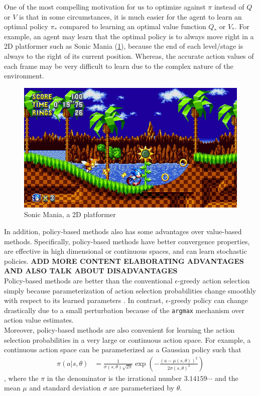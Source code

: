 \documentclass[12pt]{report}
\begin{document}
One of the most compelling motivation for us to optimize against $\pi$ instead of $Q$ or $V$ is that in some circumstances, it is much easier for the agent to learn an optimal policy $\pi_*$ compared to learning an optimal value function $Q_*$ or $V_*$. For example, an agent may learn that the optimal policy is to always move right in a 2D platformer such as Sonic Mania (\ref{fig:sonic}), because the end of each level/stage is always to the right of its current position. Whereas, the accurate action values of each frame may be very difficult to learn due to the complex nature of the environment.
\begin{figure}[H]
    \center
    \includegraphics[width=0.3\linewidth]{figs/sonic_mania.jpg}
    \caption{Sonic Mania, a 2D platformer}
    \label{fig:sonic}
\end{figure}
In addition, policy-based methods also has some advantages over value-based methods. Specifically, policy-based methods have better convergence properties, are effective in high dimensional or continuous spaces, and can learn stochastic policies. \textbf{ADD MORE CONTENT ELABORATING ADVANTAGES AND ALSO TALK ABOUT DISADVANTAGES}\\

Policy-based methods are better than the conventional $\epsilon$-greedy action selection simply because parameterization of action selection probabilities change smoothly with respect to its learned parameters \cite{sutton2018reinforcement}. In contrast, $\epsilon$-greedy policy can change drastically due to a small perturbation because of the \texttt{argmax} mechanism over action value estimates.\\

Moreover, policy-based methods are also convenient for learning the action selection probabilities in a very large or continuous action space. For example, a continuous action space can be parameterized as a Gaussian policy such that
\begin{align}
    \pi(a|s,\theta) &= \frac{1}{\sigma(s,\theta)\sqrt{2\pi}}\exp \left(-\frac{(a-\mu(s,\theta))^2}{2\sigma(s,\theta)^2}\right)
\end{align}
, where the $\pi$ in the denominator is the irrational number $3.14159\cdots$ and the mean $\mu$ and standard deviation $\sigma$ are parameterized by $\theta$.\\
\end{document}
